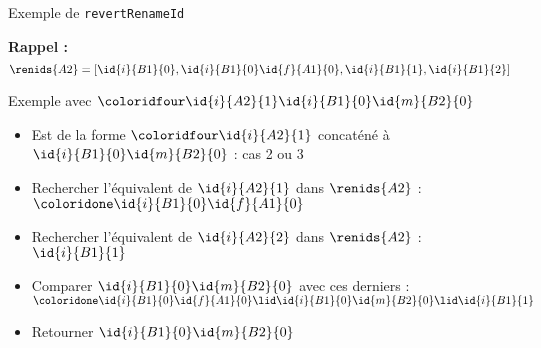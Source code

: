 \begin{frame}[fragile]{Exemple de \texttt{revertRenameId}}
\begin{figure}
{
    }
  \end{figure}
  \textbf{Rappel : }
  \begin{equation*}
      \renids{A2} = [\id{i}{B1}{0},\id{i}{B1}{0}\id{f}{A1}{0},\id{i}{B1}{1},\id{i}{B1}{2}]
  \end{equation*}
  \begin{block}{Exemple avec {$\coloridfour\id{i}{A2}{1}\id{i}{B1}{0}\id{m}{B2}{0}$}}
    \begin{itemize}
      \item<2-> Est de la forme ${\coloridfour\id{i}{A2}{1}}$ concaténé à $\id{i}{B1}{0}\id{m}{B2}{0}$ : cas 2 ou 3
      \item<3-> Rechercher l'équivalent de $\id{i}{A2}{1}$ dans $\renids{A2}$ : {$\coloridone\id{i}{B1}{0}\id{f}{A1}{0}$}
      \item<4-> Rechercher l'équivalent de $\id{i}{A2}{2}$ dans $\renids{A2}$ : $\id{i}{B1}{1}$
      \item<5-> Comparer $\id{i}{B1}{0}\id{m}{B2}{0}$ avec ces derniers : ${\coloridone\id{i}{B1}{0}\id{f}{A1}{0}} \lid \id{i}{B1}{0}\id{m}{B2}{0} \lid \id{i}{B1}{1}$
      \item<6-> Retourner $\id{i}{B1}{0}\id{m}{B2}{0}$
    \end{itemize}
  \end{block}
\end{frame}
